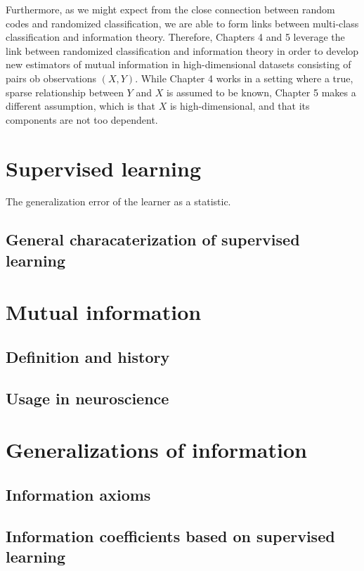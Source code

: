 Furthermore, as we might expect from the close connection between
random codes and randomized classification, we are able to form links
between multi-class classification and information theory.  Therefore,
Chapters 4 and 5 leverage the link between randomized classification
and information theory in order to develop new estimators of mutual
information in high-dimensional datasets consisting of pairs ob
observations $(X, Y)$.  While Chapter 4 works in a setting where a
true, sparse relationship between $Y$ and $X$ is assumed to be known,
Chapter 5 makes a different assumption, which is that $X$ is
high-dimensional, and that its components are not too dependent.





\section{Supervised learning}

The generalization error of the learner as a statistic.

\subsection{General characaterization of supervised learning}

\section{Mutual information}

\subsection{Definition and history}

\subsection{Usage in neuroscience}

\section{Generalizations of information}

\subsection{Information axioms}

\subsection{Information coefficients based on supervised learning}

